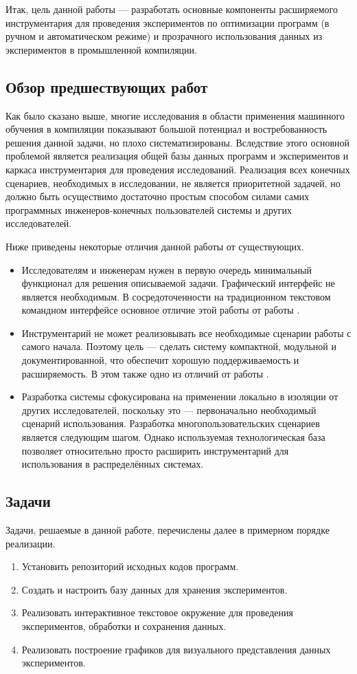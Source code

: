 Итак, цель данной работы --- разработать основные компоненты расширяемого инструментария для проведения экспериментов по оптимизации программ (в ручном и автоматическом режиме) и прозрачного использования данных из экспериментов в промышленной компиляции.


\subsection{Обзор предшествующих работ}
Как было сказано выше, многие исследования в области применения машинного обучения в компиляции \cite{Dubach2009PCO,Thomson2009RTT,Stephenson2003MOI} показывают большой потенциал и востребованность решения данной задачи, но плохо систематизированы. Вследствие этого основной проблемой является реализация общей базы данных программ и экспериментов и каркаса инструментария для проведения исследований. Реализация всех конечных сценариев, необходимых в исследовании, не является приоритетной задачей, но должно быть осуществимо достаточно простым способом силами самих программных инженеров-конечных пользователей системы и других исследователей.

Ниже приведены некоторые отличия данной работы от существующих.
\begin{itemize}
    \item Исследователям и инженерам нужен в первую очередь минимальный функционал для решения описываемой задачи. Графический интерфейс не является необходимым. В сосредоточенности на традиционном текстовом командном интерфейсе основное отличие этой работы от работы \cite{Fursin2010COP}.
    \item Инструментарий не может реализовывать все необходимые сценарии работы с самого начала. Поэтому цель --- сделать систему компактной, модульной и документированной, что обеспечит хорошую поддерживаемость и расширяемость. В этом также одно из отличий от работы \cite{Fursin2010COP}.
    \item Разработка системы сфокусирована на применении локально в изоляции от других исследователей, поскольку это --- первоначально необходимый сценарий использования. Разработка многопользовательских сценариев является следующим шагом. Однако используемая технологическая база позволяет относительно просто расширить инструментарий для использования в распределённых системах.
\end{itemize}


\subsection{Задачи}
Задачи, решаемые в данной работе, перечислены далее в примерном порядке реализации.
\begin{enumerate}
    \item Установить репозиторий исходных кодов программ.
    \item Создать и настроить базу данных для хранения экспериментов.
    \item Реализовать интерактивное текстовое окружение для проведения экспериментов, обработки и сохранения данных.
    \item Реализовать построение графиков для визуального представления данных экспериментов.
\end{enumerate}